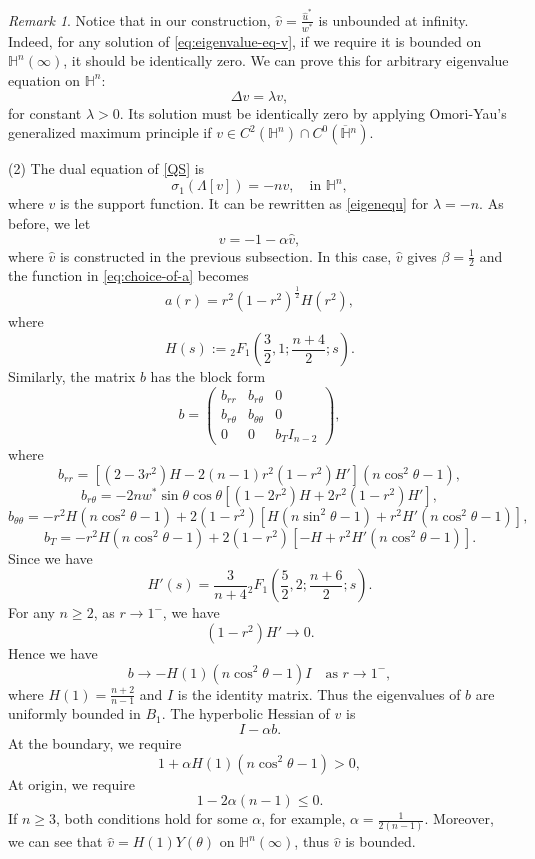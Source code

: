 \documentclass[reqno]{amsart}
\theoremstyle{remark}
\newtheorem{remark}[theorem]{Remark}
\renewcommand{\H}{{\mathbb{H}}}
\theoremstyle{definition}
\numberwithin{equation}{section}
\begin{document}
\begin{remark}
    Notice that in our construction, $\hat{v} = \frac{\hat{u}^*}{w^*}$ is unbounded at infinity. Indeed, for any solution of  \eqref{eq:eigenvalue-eq-v}, if we  require it is bounded on $\mathbb{H}^n(\infty)$, it should be identically zero. We can prove this  for arbitrary eigenvalue equation on $\mathbb{H}^n$:
    \[
    \Delta v = \lambda v,
    \]
    for constant $\lambda>0$. Its solution must be identically zero by applying Omori-Yau's generalized maximum principle if $v \in C^2(\mathbb{H}^n) \cap C^0(\overline{\mathbb{H}}{}^n)$.  
\end{remark}


(2) The dual equation of \eqref{QS} is
\begin{equation}
    \sigma_1(\Lambda[v]) = -n v,\quad \text{in } \H^n, 
\end{equation}
where $v$ is the support function.  It can be rewritten as \eqref{eigenequ} for $\lambda=-n$. As before, we let
$$v=-1-\alpha \hat{v},$$
where $\hat{v}$ is constructed in the previous subsection.  
In this case, $\hat{v}$ gives $\beta=\frac{1}{2}$ and the function in \eqref{eq:choice-of-a} becomes 
\begin{equation}
    a(r) = r^2(1-r^2)^\frac{1}{2} H(r^2),
\end{equation}
where
\[
H(s):={}_2F_1\left(\frac{3}{2}, 1; \frac{n+4}{2}; s\right).
\]
Similarly, the matrix $b$ has the block form
\[
b=
\begin{pmatrix}
b_{rr}&b_{r\theta}&0\\
b_{r\theta}&b_{\theta\theta}&0\\
0&0&b_T I_{n-2}
\end{pmatrix},
\]
where
\[
b_{rr}=\left[(2-3r^2)H-2(n-1)r^2(1-r^2)H'\right](n\cos^2\theta-1),
\]
\[
b_{r\theta}=-2nw^*\sin\theta\cos\theta\left[(1-2r^2)H+2r^2(1-r^2)H'\right],
\]
\[
b_{\theta\theta}=-r^2H(n\cos^2\theta-1) + 2(1-r^2)\left[H(n\sin^2\theta-1)+r^2H'(n\cos^2\theta-1)\right],
\]
\[
b_T=-r^2H(n\cos^2\theta-1) + 2(1-r^2)\left[-H+r^2H'(n\cos^2\theta-1)\right].
\]
Since we have
\[
H'(s) = \frac{3}{n+4} {}_2F_1\left(\frac{5}{2}, 2; \frac{n+6}{2}; s\right).
\]
For any $n \geqslant 2$, as $r\to1^-$, we have
\[
(1-r^2)H' \to 0. 
\]
Hence we have
\[
b \to -H(1)(n\cos^2\theta-1)I \quad \text{as } r\to1^-,
\]
where $H(1) = \frac{n+2}{n-1}$ and $I$ is the identity matrix. Thus the eigenvalues of $b$ are uniformly bounded in $B_1$. The hyperbolic Hessian of $v$ is 
\[
I - \alpha b.
\]
At the boundary, we require
\[
1 + \alpha H(1)(n\cos^2\theta-1) > 0,
\]
At origin, we require
\[
1 - 2\alpha (n-1) \leqslant 0.
\]
If $n \geqslant 3$, both conditions hold for some $\alpha$, for example, $\alpha = \frac{1}{2(n-1)}$. 
Moreover, we can see that $\hat{v} = H(1)Y(\theta)$ on $\mathbb{H}^n(\infty)$, thus $\hat{v}$ is bounded. 
\end{document}
